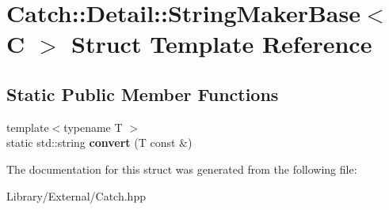 \hypertarget{struct_catch_1_1_detail_1_1_string_maker_base}{}\section{Catch\+:\+:Detail\+:\+:String\+Maker\+Base$<$ C $>$ Struct Template Reference}
\label{struct_catch_1_1_detail_1_1_string_maker_base}
\subsection*{Static Public Member Functions}
\begin{DoxyCompactItemize}
\item 
\hypertarget{struct_catch_1_1_detail_1_1_string_maker_base_a8eb9f635dc413a5758e22614bafaf1a3}{}{\footnotesize template$<$typename T $>$ }\\static std\+::string {\bfseries convert} (T const \&)\label{struct_catch_1_1_detail_1_1_string_maker_base_a8eb9f635dc413a5758e22614bafaf1a3}

\end{DoxyCompactItemize}


The documentation for this struct was generated from the following file\+:\begin{DoxyCompactItemize}
\item 
Library/\+External/Catch.\+hpp\end{DoxyCompactItemize}
